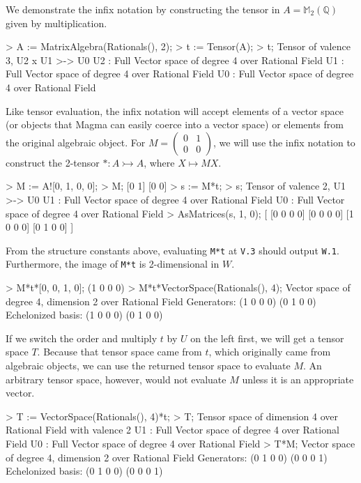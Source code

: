 \begin{example}[BimapInfix]

We demonstrate the infix notation by constructing the tensor in $A=\mathbb{M}_2(\mathbb{Q})$ given by multiplication.
\begin{code}
> A := MatrixAlgebra(Rationals(), 2);
> t := Tensor(A);
> t;
Tensor of valence 3, U2 x U1 >-> U0
U2 : Full Vector space of degree 4 over Rational Field
U1 : Full Vector space of degree 4 over Rational Field
U0 : Full Vector space of degree 4 over Rational Field
\end{code}

Like tensor evaluation, the infix notation will accept elements of a vector space (or objects that Magma can easily coerce into a vector space) or elements from the original algebraic object.
For $M=\left(\begin{smallmatrix} 0 & 1 \\ 0 & 0 \end{smallmatrix}\right)$, we will use the infix notation to construct the 2-tensor $* : A\rightarrowtail A$, where $X\mapsto MX$. 
\begin{code}
> M := A![0, 1, 0, 0];
> M;
[0 1]
[0 0]
> s := M*t;
> s;
Tensor of valence 2, U1 >-> U0
U1 : Full Vector space of degree 4 over Rational Field
U0 : Full Vector space of degree 4 over Rational Field
> AsMatrices(s, 1, 0);
[
    [0 0 0 0]
    [0 0 0 0]
    [1 0 0 0]
    [0 1 0 0]
]
\end{code}

From the structure constants above, evaluating \texttt{M*t} at \texttt{V.3} should output \texttt{W.1}.
Furthermore, the image of \texttt{M*t} is 2-dimensional in $W$.
\begin{code}
> M*t*[0, 0, 1, 0];
(1 0 0 0)
> M*t*VectorSpace(Rationals(), 4);
Vector space of degree 4, dimension 2 over Rational Field
Generators:
(1 0 0 0)
(0 1 0 0)
Echelonized basis:
(1 0 0 0)
(0 1 0 0)
\end{code}

If we switch the order and multiply $t$ by $U$ on the left first, we will get a tensor space $T$.
Because that tensor space came from $t$, which originally came from algebraic objects, we can use the returned tensor space to evaluate $M$. 
An arbitrary tensor space, however, would not evaluate $M$ unless it is an appropriate vector. 
\begin{code}
> T := VectorSpace(Rationals(), 4)*t;
> T;
Tensor space of dimension 4 over Rational Field with valence 2
U1 : Full Vector space of degree 4 over Rational Field
U0 : Full Vector space of degree 4 over Rational Field
> T*M;
Vector space of degree 4, dimension 2 over Rational Field
Generators:
(0 1 0 0)
(0 0 0 1)
Echelonized basis:
(0 1 0 0)
(0 0 0 1)
\end{code}
\end{example}



